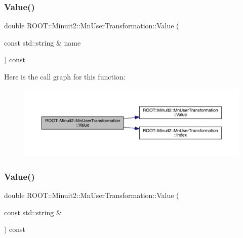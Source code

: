 \mbox{\label{classROOT_1_1Minuit2_1_1MnUserTransformation_a89cf5aca1d345e0d2d069ad6a54ff94d}} 
\subsubsection{\texorpdfstring{Value()}{Value()}\hspace{0.1cm}{\footnotesize\ttfamily [5/6]}}
{\footnotesize\ttfamily double R\+O\+O\+T\+::\+Minuit2\+::\+Mn\+User\+Transformation\+::\+Value (\begin{DoxyParamCaption}\item[{const std\+::string \&}]{name }\end{DoxyParamCaption}) const}

Here is the call graph for this function\+:
\nopagebreak
\begin{figure}[H]
\begin{center}
\leavevmode
\includegraphics[width=350pt]{d9/d98/classROOT_1_1Minuit2_1_1MnUserTransformation_a89cf5aca1d345e0d2d069ad6a54ff94d_cgraph}
\end{center}
\end{figure}
\mbox{\label{classROOT_1_1Minuit2_1_1MnUserTransformation_a89cf5aca1d345e0d2d069ad6a54ff94d}} 
\subsubsection{\texorpdfstring{Value()}{Value()}\hspace{0.1cm}{\footnotesize\ttfamily [6/6]}}
{\footnotesize\ttfamily double R\+O\+O\+T\+::\+Minuit2\+::\+Mn\+User\+Transformation\+::\+Value (\begin{DoxyParamCaption}\item[{const std\+::string \&}]{ }\end{DoxyParamCaption}) const}

